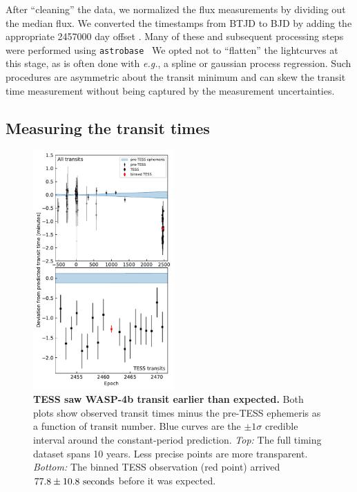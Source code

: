 \documentclass[12pt,twocolumn,tighten]{aastex62}
\begin{document}
After ``cleaning'' the data, we normalized the flux measurements by
dividing out the median flux.  We converted the timestamps from BTJD
to BJD by adding the appropriate 2457000 day offset
\citep{tess_data_product_description_2018}.  Many of these and
subsequent processing steps were performed using
\texttt{astrobase}~\citep{bhatti_astrobase_2018} We opted not to
``flatten'' the lightcurves at this stage, as is often done with {\it
e.g.}, a spline or gaussian process regression.  Such procedures are
asymmetric about the transit minimum and can skew the transit time
measurement without being captured by the measurement uncertainties.



\subsection{Measuring the transit times}
\label{sec:measurement}

\begin{figure}[t]
    \begin{center}
        \leavevmode
        \includegraphics[width=0.48\textwidth]{f2.pdf}
    \end{center}
    \vspace{-0.6cm}
    \caption{
        {\bf TESS saw WASP-4b transit earlier than expected.}
        Both plots show observed transit times minus the pre-TESS
        ephemeris as a function of transit number.  Blue curves are
        the $\pm 1\sigma$ credible interval around the constant-period
        prediction.  {\it Top:} The full timing dataset spans 10
        years.  Less precise points are more transparent.  {\it
        Bottom:} The binned TESS observation (red point) arrived $77.8
        \pm 10.8\ {\rm seconds}$ before it was expected.
        \label{fig:arrived_early}
    }
\end{figure}
\end{document}
